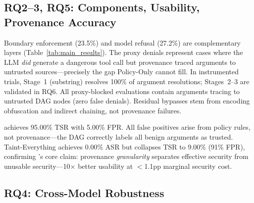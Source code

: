 \subsection{RQ2--3, RQ5: Components, Usability, Provenance Accuracy}

Boundary enforcement (23.5\%) and model refusal (27.2\%) are complementary layers (Table~\ref{tab:main_results}). The proxy denials represent cases where the LLM \emph{did} generate a dangerous tool call but provenance traced arguments to untrusted sources---precisely the gap Policy-Only cannot fill. In instrumented trials, Stage~1 (substring) resolves 100\% of argument resolutions; Stages~2--3 are validated in RQ6. All proxy-blocked evaluations contain arguments tracing to untrusted DAG nodes (zero false denials). Residual bypasses stem from encoding obfuscation and indirect chaining, not provenance failures.

\sys{} achieves 95.00\% TSR with 5.00\% FPR. All false positives arise from policy rules, not provenance---the DAG correctly labels all benign arguments as trusted. Taint-Everything achieves 0.00\% ASR but collapses TSR to 9.00\% (91\% FPR), confirming \sys{}'s core claim: provenance \emph{granularity} separates effective security from unusable security---10$\times$ better usability at $<$1.1pp marginal security cost.

\subsection{RQ4: Cross-Model Robustness}

\begin{table}[t]
\centering
\caption{Per-model \sys{} results (mean over 5 reps). All five model families show consistent defense despite different architectures, parameter counts, and providers.}
\label{tab:crossmodel}
\small
{}
\end{table}

